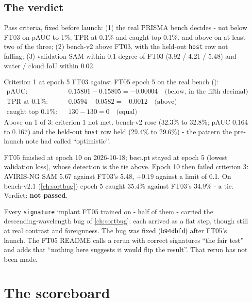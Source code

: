 \subsection{The verdict}

Pass criteria, fixed before launch: (1) the real PRISMA bench decides - not below FT03 on pAUC to 1\%, TPR at 0.1\% and
caught top 0.1\%, and above on at least two of the three; (2) bench-v2 above FT03, with the held-out \texttt{host} row
not falling; (3) validation SAM within 0.1 degree of FT03 (3.92 / 4.21 / 5.48) and water / cloud IoU within 0.02.

\begin{worked}[label={we:ftruns:ft05crit}]{Criterion 1 at epoch 5}
FT03 against FT05 epoch 5 on the real bench ():
\begin{align*}
\text{pAUC:}\quad & 0.15801 - 0.15805 = -0.00004 \quad\text{(below, in the fifth decimal)}\\
\text{TPR at 0.1\%:}\quad & 0.0594 - 0.0582 = +0.0012 \quad\text{(above)}\\
\text{caught top 0.1\%:}\quad & 130 - 130 = 0 \quad\text{(equal)}
\end{align*}
Above on 1 of 3: criterion 1 not met. bench-v2 rose (32.3\% to 32.8\%; pAUC 0.164 to 0.167) and the held-out
\texttt{host} row held (29.4\% to 29.6\%) - the pattern the pre-launch note had called ``optimistic''.
\end{worked}

FT05 finished at epoch 10 on 2026-10-18; best.pt stayed at epoch 5 (lowest validation loss), whose detection is the
tie above. Epoch 10 then failed criterion 3: AVIRIS-NG SAM 5.67 against FT03's 5.48, $+0.19$ against a limit of 0.1.
On bench-v2.1 (\cref{ch:sortbug}) epoch 5 caught 35.4\% against FT03's 34.9\% - a tie. Verdict: \textbf{not passed}.

\begin{sourcenote}
Every \texttt{signature} implant FT05 trained on - half of them - carried the descending-wavelength 
bug of \cref{ch:sortbug}: each arrived as a flat step, though still at real contrast and foreignness. The bug was fixed
(\texttt{b94dbfd}) after FT05's launch. The FT05 README calls a rerun with correct signatures ``the fair test'' and adds
that ``nothing here suggests it would flip the result''. That rerun has not been made.
\end{sourcenote}

\section{The scoreboard}\label{sec:ftruns:board}

